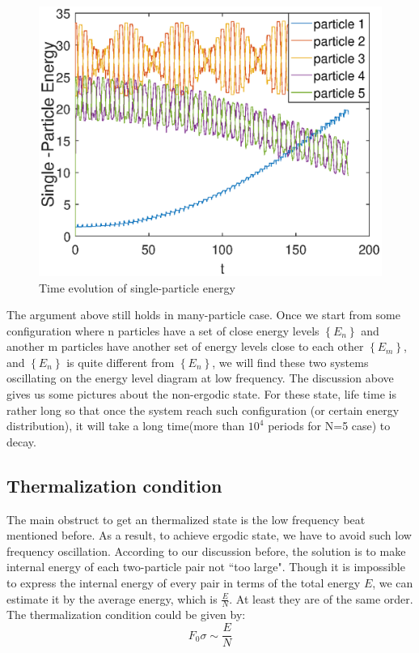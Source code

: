 \documentclass[aps,preprintnumbers,onecolumn,amsmath,amssymb,floatfix,pra]{revtex4-1}
\begin{document}
\begin{figure}
\centering
\includegraphics[scale=0.5]{ZhiyuPictures/pair1_pre.eps}
\caption{Time evolution of single-particle energy}
\label{fig:thermalization4}
\end{figure}

The argument above still holds in many-particle case. Once we start from some configuration where n particles have a set of close energy levels $\left\lbrace E_n\right\rbrace $ and another m particles have another set of energy levels close to each other $\left\lbrace E_m\right\rbrace $, and $\left\lbrace E_n\right\rbrace $ is quite different from $\left\lbrace E_n\right\rbrace $, we will find these two systems oscillating on the energy level diagram at low frequency. 
The discussion above gives us some pictures about the non-ergodic state. For these state, life time is rather long so that once the system reach such configuration (or certain energy distribution), it will take a long time(more than $10^4$ periods for N=5 case) to decay. 

\subsection{Thermalization condition}
The main obstruct to get an thermalized state is the low frequency beat mentioned before. As a result, to achieve ergodic state, we have to avoid such low frequency oscillation. According to our discussion before, the solution is to make internal energy of each two-particle pair not ``too large". Though it is impossible to express the internal energy of every pair in terms of the total energy $E$, we can estimate it by the average energy, which is $\frac{E}{N}$. At least they are of the same order. The thermalization condition could be given by:
\begin{equation}
F_0\sigma\sim\frac{E}{N}
\label{eq:thermalizatiton condition}
\end{equation}
\end{document}
